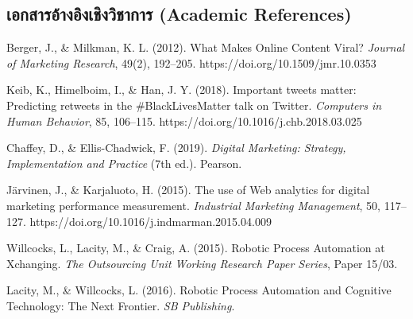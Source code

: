 \documentclass[10pt,a4paper]{article}
\begin{document}
\subsection{เอกสารอ้างอิงเชิงวิชาการ (Academic References)}
\begin{enumerate}[label={[\arabic*]}]
  \item Berger, J., \& Milkman, K. L. (2012). What Makes Online Content Viral? \textit{Journal of Marketing Research}, 49(2), 192--205. https://doi.org/10.1509/jmr.10.0353
  \item Keib, K., Himelboim, I., \& Han, J. Y. (2018). Important tweets matter: Predicting retweets in the \#BlackLivesMatter talk on Twitter. \textit{Computers in Human Behavior}, 85, 106--115. https://doi.org/10.1016/j.chb.2018.03.025
  \item Chaffey, D., \& Ellis-Chadwick, F. (2019). \textit{Digital Marketing: Strategy, Implementation and Practice} (7th ed.). Pearson.
  \item Järvinen, J., \& Karjaluoto, H. (2015). The use of Web analytics for digital marketing performance measurement. \textit{Industrial Marketing Management}, 50, 117--127. https://doi.org/10.1016/j.indmarman.2015.04.009
  \item Willcocks, L., Lacity, M., \& Craig, A. (2015). Robotic Process Automation at Xchanging. \textit{The Outsourcing Unit Working Research Paper Series}, Paper 15/03.
  \item Lacity, M., \& Willcocks, L. (2016). Robotic Process Automation and Cognitive Technology: The Next Frontier. \textit{SB Publishing}.
\end{enumerate}
\end{document}
